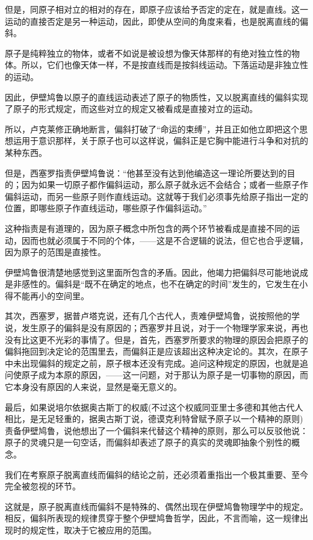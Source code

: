 \documentclass[a4paper,twoside,12pt]{ctexart}
\begin{document}
但是，同原子相对立的相对的存在，即原子应该给予否定的定在，就是直线。这一运动的直接否定是另一种运动，因此，即使从空间的角度来看，也是脱离直线的偏斜。

原子是纯粹独立的物体，或者不如说是被设想为像天体那样的有绝对独立性的物体。所以，它们也像天体一样，不是按直线而是按斜线运动。下落运动是非独立性的运动。

因此，伊壁鸠鲁以原子的直线运动表述了原子的物质性，又以脱离直线的偏斜实现了原子的形式规定，而这些对立的规定又被看成是直接对立的运动。

所以，卢克莱修正确地断言，偏斜打破了“命运的束缚”，并且正如他立即把这个思想运用于意识那样，关于原子也可以这样说，偏斜正是它胸中能进行斗争和对抗的某种东西。

但是，西塞罗指责伊壁鸠鲁说：“他甚至没有达到他编造这一理论所要达到的目的；因为如果一切原子都作偏斜运动，那么原子就永远不会结合；或者一些原子作偏斜运动，而另一些原子则作直线运动。这就等于我们必须事先给原子指出一定的位置，即哪些原子作直线运动，哪些原子作偏斜运动。”

这种指责是有道理的，因为原子概念中所包含的两个环节被看成是直接不同的运动，因而也就必须属于不同的个体，——这是不合逻辑的说法，但它也合乎逻辑，因为原子的范围是直接性。

伊壁鸠鲁很清楚地感觉到这里面所包含的矛盾。因此，他竭力把偏斜尽可能地说成是非感性的。偏斜是“既不在确定的地点，也不在确定的时间”发生的，它发生在小得不能再小的空间里。

其次，西塞罗，据普卢塔克说，还有几个古代人，责难伊壁鸠鲁，说按照他的学说，发生原子的偏斜是没有原因的；西塞罗并且说，对于一个物理学家来说，再也没有比这更不光彩的事情了。但是，首先，西塞罗所要求的物理的原因会把原子的偏斜拖回到决定论的范围里去，而偏斜正是应该超出这种决定论的。其次，在原子中未出现偏斜的规定之前，原子根本还没有完成。追问这种规定的原因，也就是追问使原子成为本原的原因，——这一问题，对于那认为原子是一切事物的原因，而它本身没有原因的人来说，显然是毫无意义的。

最后，如果说培尔依据奥古斯丁的权威(不过这个权威同亚里士多德和其他古代人相比，是无足轻重的，据奥古斯丁说，德谟克利特曾赋予原子以一个精神的原则)责备伊壁鸠鲁，说他想出了一个偏斜来代替这个精神的原则，那么可以反驳他说：原子的灵魂只是一句空话，而偏斜却表述了原子的真实的灵魂即抽象个别性的概念。

我们在考察原子脱离直线而偏斜的结论之前，还必须着重指出一个极其重要、至今完全被忽视的环节。

这就是，原子脱离直线而偏斜不是特殊的、偶然出现在伊壁鸠鲁物理学中的规定。相反，偏斜所表现的规律贯穿于整个伊壁鸠鲁哲学，因此，不言而喻，这一规律出现时的规定性，取决于它被应用的范围。
\end{document}
